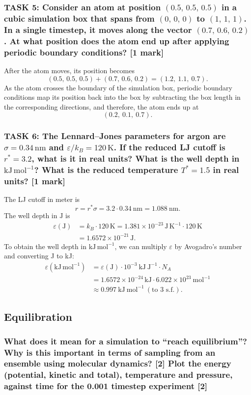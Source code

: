 \documentclass[a4paper,10pt,twocolumn]{article}
\begin{document}
\subsubsection*{TASK 5: Consider an atom at position $(0.5,\,0.5,\,0.5)$ in a cubic simulation box that spans from $(0,\,0,\,0)$ to $(1,\,1,\,1)$. In a single timestep, it moves along the vector $(0.7,\,0.6,\,0.2)$. At what position does the atom end up after applying periodic boundary conditions? [1 mark]}
After the atom moves, its position becomes
\[
(0.5,\,0.5,\,0.5)+ (0.7,\,0.6,\,0.2)=(1.2,\ 1.1,\ 0.7).
\] 
As the atom crosses the boundary of the simulation box, periodic boundary conditions map its position back into the box by subtracting the box length in the corresponding directions, and therefore, the atom ends up at
\[
(0.2,\ 0.1,\ 0.7).
\]
\subsubsection*{TASK 6: The Lennard--Jones parameters for argon are $\sigma = 0.34\,\mathrm{nm}$ and $\varepsilon/k_B = 120\,\mathrm{K}$. If the reduced LJ cutoff is $r^* = 3.2$, what is it in real units? What is the well depth in $\mathrm{kJ\,mol^{-1}}$? What is the reduced temperature $T^* = 1.5$ in real units? [1 mark]}
The LJ cutoff in meter is 
\[
r=r^*\sigma=3.2\cdot 0.34\ \mathrm{nm}=1.088\ \mathrm{nm}.
\]
The well depth in $\mathrm{J}$ is
\begin{align*}
\varepsilon(\mathrm{J}) &= k_B \cdot 120\,\mathrm{K} =1.381\times10^{-23}\,\mathrm{J\,K^{-1}}\cdot120\,\mathrm{K} 
\\
&=  1.6572\times10^{-21}\,\mathrm{J}.
\end{align*}
To obtain the well depth in $\mathrm{kJ\,mol^{-1}}$, we can multiply $\varepsilon$ by Avogadro's number and converting J to kJ:
\begin{align*}
\varepsilon(\mathrm{kJ\,mol^{-1}}) 
&= \varepsilon(\mathrm{J})\cdot10^{-3}\ \mathrm{kJ\ J^{-1}}\cdot N_A
\\
&=  1.6572\times10^{-24}\,\mathrm{kJ}\cdot 6.022\times10^{23}\ \mathrm{mol^{-1}}
\\
&\approx 0.997\ \mathrm{kJ\ mol^{-1}}\ (\text{to 3 s.f.}).
\end{align*}
\subsection{Equilibration}
\subsubsection*{What does it mean for a simulation to ``reach equilibrium''? Why is this important in terms of sampling from an ensemble using molecular dynamics? [2]
Plot the energy (potential, kinetic and total), temperature and pressure, against time for the 0.001 timestep experiment [2] }
\end{document}
